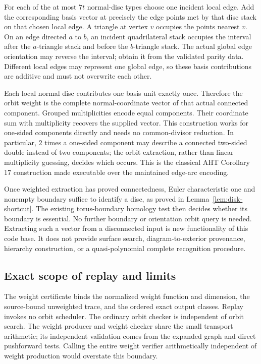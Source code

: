 For each of the at most $7t$ normal-disc types choose one incident local
edge. Add the corresponding basis vector at precisely the edge points
met by that disc stack on that chosen local edge. A triangle at vertex
$v$ occupies the points nearest $v$. On an edge directed $a$ to $b$, an
incident quadrilateral stack occupies the interval after the $a$-triangle
stack and before the $b$-triangle stack. The actual global edge orientation
may reverse the interval; obtain it from the validated parity data.
Different local edges may represent one global edge, so these basis
contributions are additive and must not overwrite each other.

Each local normal disc contributes one basis unit exactly once. Therefore
the orbit weight is the complete normal-coordinate vector of that actual
connected component. Grouped multiplicities encode equal components.
Their coordinate sum with multiplicity recovers the supplied vector.
This construction works for one-sided components directly and needs no
common-divisor reduction. In particular, $2$ times a one-sided component
may describe a connected two-sided double instead of two components;
the orbit extraction, rather than linear multiplicity guessing, decides
which occurs. This is the classical AHT Corollary 17 construction made
executable over the maintained edge-arc encoding.

Once weighted extraction has proved connectedness, Euler characteristic
one and nonempty boundary suffice to identify a disc, as proved in
Lemma~\ref{lem:disk-shortcut}. The existing torus-boundary homology test
then decides whether its boundary is essential. No further boundary or
orientation orbit query is needed. Extracting such a vector from
a disconnected input is new functionality of this code base. It does not
provide surface search, diagram-to-exterior provenance, hierarchy
construction, or a quasi-polynomial complete recognition procedure.

\subsection{Exact scope of replay and limits}

The weight certificate binds the normalized weight function and dimension,
the source-bound unweighted trace, and the ordered exact output classes.
Replay invokes no orbit scheduler. The ordinary orbit checker is
independent of orbit search. The weight producer and weight checker share
the small transport arithmetic; its independent validation comes from
the expanded graph and direct pushforward tests. Calling the entire
weight verifier arithmetically independent of weight production would
overstate this boundary.

